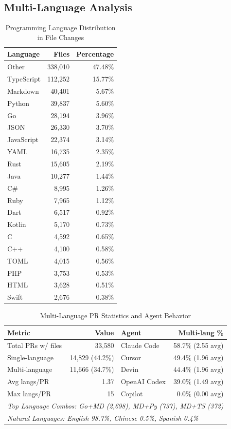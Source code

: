 \documentclass[11pt]{article}
\begin{document}
\subsection{Multi-Language Analysis}
\begin{table}[H]
\centering
\caption{Programming Language Distribution in File Changes}
\small
\begin{tabular}{@{}lrr@{}}
\toprule
\textbf{Language} & \textbf{Files} & \textbf{Percentage} \\
\midrule
Other & 338,010 & 47.48\% \\
TypeScript & 112,252 & 15.77\% \\
Markdown & 40,401 & 5.67\% \\
Python & 39,837 & 5.60\% \\
Go & 28,194 & 3.96\% \\
JSON & 26,330 & 3.70\% \\
JavaScript & 22,374 & 3.14\% \\
YAML & 16,735 & 2.35\% \\
Rust & 15,605 & 2.19\% \\
Java & 10,277 & 1.44\% \\
C\# & 8,995 & 1.26\% \\
Ruby & 7,965 & 1.12\% \\
Dart & 6,517 & 0.92\% \\
Kotlin & 5,170 & 0.73\% \\
C & 4,592 & 0.65\% \\
C++ & 4,100 & 0.58\% \\
TOML & 4,015 & 0.56\% \\
PHP & 3,753 & 0.53\% \\
HTML & 3,628 & 0.51\% \\
Swift & 2,676 & 0.38\% \\
\bottomrule
\end{tabular}
\end{table}

\begin{table}[H]
\centering
\caption{Multi-Language PR Statistics and Agent Behavior}
\small
\begin{tabular}{@{}lrlr@{}}
\toprule
\textbf{Metric} & \textbf{Value} & \textbf{Agent} & \textbf{Multi-lang \%} \\
\midrule
Total PRs w/ files & 33,580 & Claude Code & 58.7\% (2.55 avg) \\
Single-language & 14,829 (44.2\%) & Cursor & 49.4\% (1.96 avg) \\
Multi-language & 11,666 (34.7\%) & Devin & 44.4\% (1.96 avg) \\
Avg langs/PR & 1.37 & OpenAI Codex & 39.0\% (1.49 avg) \\
Max langs/PR & 15 & Copilot & 0.0\% (0.00 avg) \\
\midrule
\multicolumn{4}{l}{\textit{Top Language Combos: Go+MD (2,698), MD+Py (737), MD+TS (372)}} \\
\multicolumn{4}{l}{\textit{Natural Languages: English 98.7\%, Chinese 0.5\%, Spanish 0.4\%}} \\
\bottomrule
\end{tabular}
\end{table}
\end{document}
